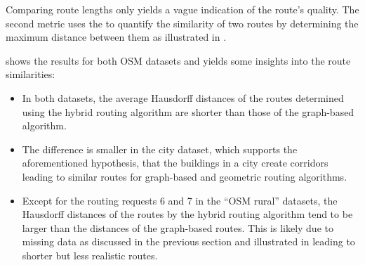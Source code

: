 			Comparing route lengths only yields a vague indication of the route's quality.
			The second metric uses the  to quantify the similarity of two routes by determining the maximum distance between them as illustrated in .
			
			 shows the results for both OSM datasets and yields some insights into the route similarities:
			\begin{itemize}
				\item In both datasets, the average Hausdorff distances of the routes determined using the hybrid routing algorithm are shorter than those of the graph-based algorithm.
				\item The difference is smaller in the city dataset, which supports the aforementioned hypothesis, that the buildings in a city create corridors leading to similar routes for graph-based and geometric routing algorithms.
				\item Except for the routing requests 6 and 7 in the \enquote{OSM rural} datasets, the Hausdorff distances of the routes by the hybrid routing algorithm tend to be larger than the distances of the graph-based routes.
				This is likely due to missing data as discussed in the previous section and illustrated in  leading to shorter but less realistic routes.
			\end{itemize}
			
